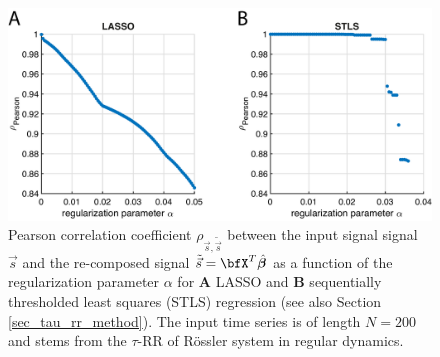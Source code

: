 \documentclass[entropy,article,submit,pdftex,moreauthors]{Definitions/mdpi}
\begin{document}
\begin{figure}[h!]
 \centering
 \includegraphics[width=\textwidth]{./figures/fig_regularization}
 \caption{Pearson correlation coefficient $\rho_{\vec{s},\tilde{\vec{s}}}$ between the input signal signal $\vec{s}$ and the re-composed signal $\tilde{\vec{s}}=\bfX^T\hat{\boldsymbol\beta}$ as a 
 function of the regularization parameter $\alpha$ for \textbf{A} LASSO and \textbf{B} sequentially thresholded least squares (STLS) regression (see also Section \ref{sec_tau_rr_method}). 
 The input time series is of length $N=200$ and stems from the $\tau$-RR of R\"ossler system in regular dynamics.}
\label{fig_regularization}
\end{figure}
\end{document}
